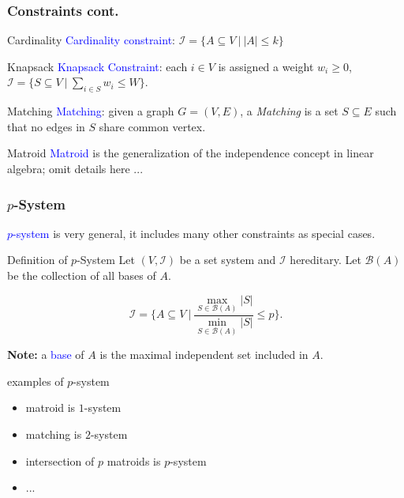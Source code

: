 \documentclass{beamer}
\newcommand{\calI}{\mathcal{I}}
\newcommand{\emRed}[1][]{\textcolor{blue} #1}
\begin{document}
\begin{frame}
  \frametitle{Constraints cont.}
\begin{block}{Cardinality}
    \emRed{Cardinality constraint}: $\calI = \{A \subseteq V ~|~ |A| \leq k\}$
  \end{block}
  \pause
  \begin{block}{Knapsack}
   \emRed{Knapsack Constraint}: each $i \in V$ is assigned a weight $w_i \geq 0$,  $\calI = \{S \subseteq V ~|~ \sum_{i\in S} w_i \leq W \}$.
  \end{block}

  \pause

  \begin{block}{Matching}
     \emRed{Matching}: given a graph $G = (V, E)$, a \emph{Matching} is a set $S\subseteq E$ such that no edges in $S$ share common vertex.
  \end{block}
  \pause
  \begin{block}{Matroid}
    \emRed{Matroid} is the generalization of the independence concept in linear algebra;
    omit details here ...
  \end{block}


\end{frame}




\begin{frame}
  \frametitle{$p$-System}
\emRed{$p$-system} is very general, it includes many other constraints as special cases.

\begin{block}{Definition of $p$-System}
Let $(V, \calI)$ be a set system and $\calI$ hereditary.  Let $\mathcal{B}(A)$ be the collection of all bases of $A$.

$$\calI = \{ A \subseteq V ~|~ \frac{\max_{S\in\mathcal{B}(A)}|S|}{\min_{S\in\mathcal{B}(A)}|S|} \leq p \}.$$
\end{block}
\pause
\textbf{Note:} a \emRed{base} of $A$ is the maximal independent set included in $A$. 
\pause
\begin{block}{examples of $p$-system}
  \begin{itemize}
    \item matroid is $1$-system
    \item matching is $2$-system
    \item intersection of $p$ matroids is $p$-system
    \item ...
  \end{itemize}
\end{block}
\end{frame}
\end{document}
